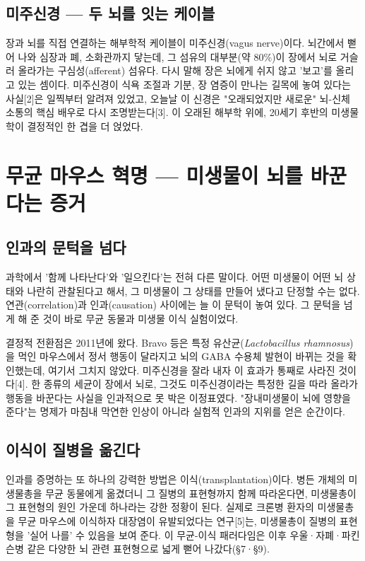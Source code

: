 \documentclass[12pt,oneside]{book}
\begin{document}
\subsection{미주신경 — 두 뇌를 잇는 케이블}

장과 뇌를 직접 연결하는 해부학적 케이블이 미주신경(vagus nerve)이다. 뇌간에서 뻗어 나와 심장과 폐, 소화관까지 닿는데, 그 섬유의 대부분(약 80\%)이 장에서 뇌로 거슬러 올라가는 구심성(afferent) 섬유다. 다시 말해 장은 뇌에게 쉬지 않고 '보고'를 올리고 있는 셈이다. 미주신경이 식욕 조절과 기분, 장 염증이 만나는 길목에 놓여 있다는 사실[2]은 일찍부터 알려져 있었고, 오늘날 이 신경은 "오래되었지만 새로운" 뇌-신체 소통의 핵심 배우로 다시 조명받는다[3]. 이 오래된 해부학 위에, 20세기 후반의 미생물학이 결정적인 한 겹을 더 얹었다.

\section{무균 마우스 혁명 — 미생물이 뇌를 바꾼다는 증거}

\subsection{인과의 문턱을 넘다}

과학에서 '함께 나타난다'와 '일으킨다'는 전혀 다른 말이다. 어떤 미생물이 어떤 뇌 상태와 나란히 관찰된다고 해서, 그 미생물이 그 상태를 만들어 냈다고 단정할 수는 없다. 연관(correlation)과 인과(causation) 사이에는 늘 이 문턱이 놓여 있다. 그 문턱을 넘게 해 준 것이 바로 무균 동물과 미생물 이식 실험이었다.

결정적 전환점은 2011년에 왔다. Bravo 등은 특정 유산균(\textit{Lactobacillus rhamnosus})을 먹인 마우스에서 정서 행동이 달라지고 뇌의 GABA 수용체 발현이 바뀌는 것을 확인했는데, 여기서 그치지 않았다. 미주신경을 잘라 내자 이 효과가 통째로 사라진 것이다[4]. 한 종류의 세균이 장에서 뇌로, 그것도 미주신경이라는 특정한 길을 따라 올라가 행동을 바꾼다는 사실을 인과적으로 못 박은 이정표였다. "장내미생물이 뇌에 영향을 준다"는 명제가 마침내 막연한 인상이 아니라 실험적 인과의 지위를 얻은 순간이다.

\subsection{이식이 질병을 옮긴다}

인과를 증명하는 또 하나의 강력한 방법은 이식(transplantation)이다. 병든 개체의 미생물총을 무균 동물에게 옮겼더니 그 질병의 표현형까지 함께 따라온다면, 미생물총이 그 표현형의 원인 가운데 하나라는 강한 정황이 된다. 실제로 크론병 환자의 미생물총을 무균 마우스에 이식하자 대장염이 유발되었다는 연구[5]는, 미생물총이 질병의 표현형을 '실어 나를' 수 있음을 보여 준다. 이 무균-이식 패러다임은 이후 우울·자폐·파킨슨병 같은 다양한 뇌 관련 표현형으로 넓게 뻗어 나갔다(§7·§9).
\end{document}
